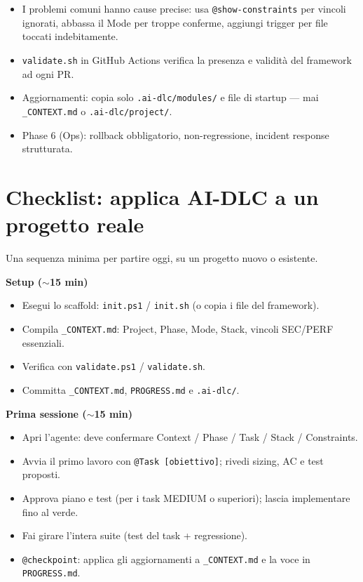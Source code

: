 \section*{\LabelSummary}

\begin{itemize}
  \item I problemi comuni hanno cause precise: usa \texttt{@show-constraints} per vincoli ignorati, abbassa il Mode per troppe conferme, aggiungi trigger per file toccati indebitamente.
  \item \texttt{validate.sh} in GitHub Actions verifica la presenza e validità del framework ad ogni PR.
  \item Aggiornamenti: copia solo \texttt{.ai-dlc/modules/} e file di startup --- mai \texttt{\_CONTEXT.md} o \texttt{.ai-dlc/project/}.
  \item Phase 6 (Ops): rollback obbligatorio, non-regressione, incident response strutturata.
\end{itemize}

\section*{Checklist: applica AI-DLC a un progetto reale}

Una sequenza minima per partire oggi, su un progetto nuovo o esistente.

\textbf{Setup ($\sim$15 min)}
\begin{itemize}
  \item[$\square$] Esegui lo scaffold: \texttt{init.ps1} / \texttt{init.sh} (o copia i file del framework).
  \item[$\square$] Compila \texttt{\_CONTEXT.md}: Project, Phase, Mode, Stack, vincoli SEC/PERF essenziali.
  \item[$\square$] Verifica con \texttt{validate.ps1} / \texttt{validate.sh}.
  \item[$\square$] Committa \texttt{\_CONTEXT.md}, \texttt{PROGRESS.md} e \texttt{.ai-dlc/}.
\end{itemize}

\textbf{Prima sessione ($\sim$15 min)}
\begin{itemize}
  \item[$\square$] Apri l'agente: deve confermare Context / Phase / Task / Stack / Constraints.
  \item[$\square$] Avvia il primo lavoro con \texttt{@Task [obiettivo]}; rivedi sizing, AC e test proposti.
  \item[$\square$] Approva piano e test (per i task MEDIUM o superiori); lascia implementare fino al verde.
  \item[$\square$] Fai girare l'intera suite (test del task + regressione).
  \item[$\square$] \texttt{@checkpoint}: applica gli aggiornamenti a \texttt{\_CONTEXT.md} e la voce in \texttt{PROGRESS.md}.
\end{itemize}

